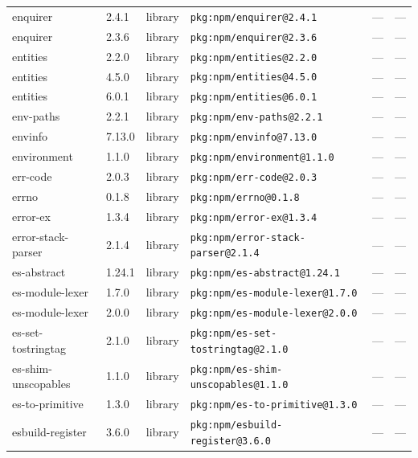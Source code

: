 \documentclass[11pt,a4paper]{article}
\begin{document}
\begin{longtable}{|p{4cm}|p{2cm}|p{1.6cm}|p{5cm}|p{1.5cm}|p{3.5cm}|}
\raggedright enquirer & 2.4.1 & library & \small\texttt{pkg:npm/enquirer@2.4.1} & — & \small — \\
\raggedright enquirer & 2.3.6 & library & \small\texttt{pkg:npm/enquirer@2.3.6} & — & \small — \\
\raggedright entities & 2.2.0 & library & \small\texttt{pkg:npm/entities@2.2.0} & — & \small — \\
\raggedright entities & 4.5.0 & library & \small\texttt{pkg:npm/entities@4.5.0} & — & \small — \\
\raggedright entities & 6.0.1 & library & \small\texttt{pkg:npm/entities@6.0.1} & — & \small — \\
\raggedright env-paths & 2.2.1 & library & \small\texttt{pkg:npm/env-paths@2.2.1} & — & \small — \\
\raggedright envinfo & 7.13.0 & library & \small\texttt{pkg:npm/envinfo@7.13.0} & — & \small — \\
\raggedright environment & 1.1.0 & library & \small\texttt{pkg:npm/environment@1.1.0} & — & \small — \\
\raggedright err-code & 2.0.3 & library & \small\texttt{pkg:npm/err-code@2.0.3} & — & \small — \\
\raggedright errno & 0.1.8 & library & \small\texttt{pkg:npm/errno@0.1.8} & — & \small — \\
\raggedright error-ex & 1.3.4 & library & \small\texttt{pkg:npm/error-ex@1.3.4} & — & \small — \\
\raggedright error-stack-parser & 2.1.4 & library & \small\texttt{pkg:npm/error-stack-parser@2.1.4} & — & \small — \\
\raggedright es-abstract & 1.24.1 & library & \small\texttt{pkg:npm/es-abstract@1.24.1} & — & \small — \\
\raggedright es-module-lexer & 1.7.0 & library & \small\texttt{pkg:npm/es-module-lexer@1.7.0} & — & \small — \\
\raggedright es-module-lexer & 2.0.0 & library & \small\texttt{pkg:npm/es-module-lexer@2.0.0} & — & \small — \\
\raggedright es-set-tostringtag & 2.1.0 & library & \small\texttt{pkg:npm/es-set-tostringtag@2.1.0} & — & \small — \\
\raggedright es-shim-unscopables & 1.1.0 & library & \small\texttt{pkg:npm/es-shim-unscopables@1.1.0} & — & \small — \\
\raggedright es-to-primitive & 1.3.0 & library & \small\texttt{pkg:npm/es-to-primitive@1.3.0} & — & \small — \\
\raggedright esbuild-register & 3.6.0 & library & \small\texttt{pkg:npm/esbuild-register@3.6.0} & — & \small — \\

\end{longtable}
\end{document}
